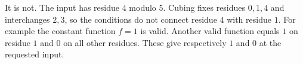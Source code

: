 It is not. The input has residue $4$ modulo $5$. Cubing fixes residues $0,1,4$ and interchanges $2,3$, so the conditions do not connect residue $4$ with residue $1$. For example the constant function $f=1$ is valid. Another valid function equals $1$ on residue $1$ and $0$ on all other residues. These give respectively $1$ and $0$ at the requested input.
